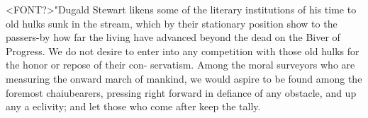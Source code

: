 <FONT?>"Dugald Stewart likens some of the literary institutions of his time
to old hulks sunk in the stream, which by their stationary position
show to the passers-by how far the living have advanced beyond the
dead on the Biver of Progress. We do not desire to enter into any
competition with those old hulks for the honor or repose of their con-
servatism. Among the moral surveyors who are measuring the onward
march of mankind, we would aspire to be found among the foremost
chaiubearers, pressing right forward in defiance of any obstacle, and
up any a eclivity; and let those who come after keep the tally.\endinput
